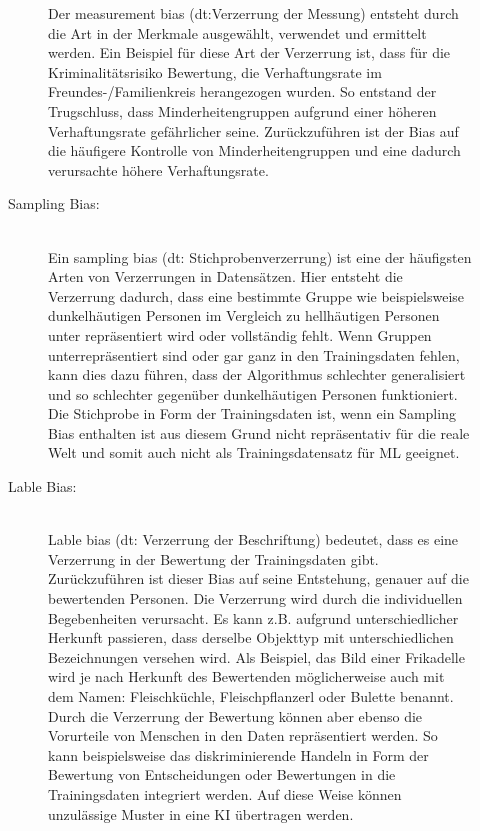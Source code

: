 \begin{onehalfspace}
\begin{description}
\begin{description}
                Der \glqq{}measurement bias\grqq{} (\ac*{dt}:Verzerrung der Messung) entsteht durch die Art in der Merkmale ausgewählt, verwendet und ermittelt werden. Ein Beispiel für diese Art der Verzerrung ist, dass für die Kriminalitätsrisiko Bewertung, die Verhaftungsrate im Freundes-/Familienkreis herangezogen wurden. So entstand der Trugschluss, dass Minderheitengruppen aufgrund einer höheren Verhaftungsrate gefährlicher seine. Zurückzuführen ist der Bias auf die häufigere Kontrolle von Minderheitengruppen und eine dadurch verursachte höhere Verhaftungsrate.\cite{silberg2019notes}\cite{srinivasan2021biases}\cite{Mehrabi2021}
                \item [Sampling Bias:] \hfill \\
                Ein \glqq{}sampling bias\grqq{} (\ac*{dt}: Stichprobenverzerrung) ist eine der häufigsten Arten von Verzerrungen in Datensätzen. Hier entsteht die Verzerrung dadurch, dass eine bestimmte Gruppe wie beispielsweise dunkelhäutigen Personen im Vergleich zu hellhäutigen Personen unter repräsentiert wird oder vollständig fehlt. Wenn Gruppen unterrepräsentiert sind oder gar ganz in den Trainingsdaten fehlen, kann dies dazu führen, dass der Algorithmus schlechter generalisiert und so schlechter gegenüber dunkelhäutigen Personen funktioniert. Die Stichprobe in Form der Trainingsdaten ist, wenn ein Sampling Bias enthalten ist aus diesem Grund nicht repräsentativ für die reale Welt und somit auch nicht als Trainingsdatensatz für \ac*{ML} geeignet.\cite{srinivasan2021biases}\cite{Mehrabi2021}
                \item [Lable Bias:] \hfill \\
                \glqq{}Lable bias\grqq{} (\ac*{dt}: Verzerrung der Beschriftung) bedeutet, dass es eine Verzerrung in der Bewertung der Trainingsdaten gibt. Zurückzuführen ist dieser Bias auf seine Entstehung, genauer auf die bewertenden Personen. Die Verzerrung wird durch die individuellen Begebenheiten verursacht. Es kann z.B. aufgrund unterschiedlicher Herkunft passieren, dass derselbe Objekttyp mit unterschiedlichen Bezeichnungen versehen wird. Als Beispiel, das Bild einer Frikadelle wird je nach Herkunft des Bewertenden möglicherweise auch mit dem Namen: Fleischküchle, Fleischpflanzerl oder Bulette benannt.
                Durch die Verzerrung der Bewertung können aber ebenso die Vorurteile von Menschen in den Daten repräsentiert werden. So kann beispielsweise das diskriminierende Handeln in Form der Bewertung von Entscheidungen oder Bewertungen in die Trainingsdaten integriert werden. Auf diese Weise können unzulässige Muster in eine \ac*{KI} übertragen werden.\cite{srinivasan2021biases}
            \end{description}
            

\end{description}
\end{onehalfspace}
